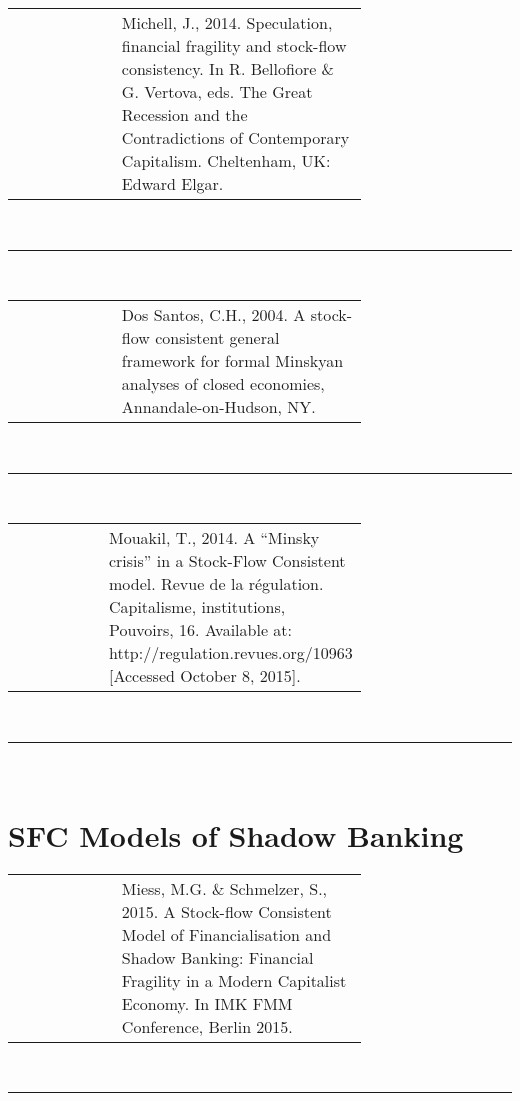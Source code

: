 \documentclass[twoside,a4paper,11pt]{article}
\begin{document}
\begin{tabular}{lp{0.7\linewidth}}
\cite{Michell2014d} & Michell, J., 2014. Speculation, financial fragility and stock-flow consistency. In R. Bellofiore \& G. Vertova, eds. The Great Recession and the Contradictions of Contemporary Capitalism. Cheltenham, UK: Edward Elgar.
\end{tabular}\\[5pt]
\begin{center}
\rule{10cm}{1pt}   \\[5pt]
\end{center}

\begin{tabular}{lp{0.7\linewidth}}
\cite{DosSantos2004} & Dos Santos, C.H., 2004. A stock-flow consistent general framework for formal Minskyan analyses of closed economies, Annandale-on-Hudson, NY.
\end{tabular}\\[5pt]
\begin{center}
\rule{10cm}{1pt}   \\[5pt]
\end{center}

\begin{tabular}{lp{0.7\linewidth}}
\cite{Mouakil2014} & Mouakil, T., 2014. A “Minsky crisis” in a Stock-Flow Consistent model. Revue de la régulation. Capitalisme, institutions, Pouvoirs, 16. Available at: http://regulation.revues.org/10963 [Accessed October 8, 2015].
\end{tabular}\\[5pt]
\begin{center}
\rule{10cm}{1pt}   \\[5pt]
\end{center}



\section{SFC Models of  Shadow Banking}

\begin{tabular}{lp{0.7\linewidth}}
\cite{Miess2015} & Miess, M.G. \& Schmelzer, S., 2015. A Stock-flow Consistent Model of Financialisation and Shadow Banking: Financial Fragility in a Modern Capitalist Economy. In IMK FMM Conference, Berlin 2015.
\end{tabular}\\[5pt]
\begin{center}
\rule{10cm}{1pt}   \\[5pt]
\end{center}
\end{document}
